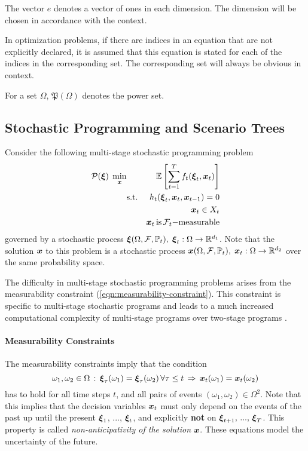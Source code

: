 The vector $e$ denotes a vector of ones in each dimension.
The dimension will be chosen in accordance with the context. 

In optimization problems, if there are indices in an equation that are not explicitly declared, it is assumed that this equation is stated for each of the indices in the corresponding set.
The corresponding set will always be obvious in context.

For a set $\Omega$, $\mathfrak{P}(\Omega)$ denotes the power set.
\subsection{Stochastic Programming and Scenario Trees}
Consider the following multi-stage stochastic programming problem 
\begin{eqnarray}
  \label{eq:genericSP}
  \mathcal{P}(\boldsymbol\xi)\;\min_{\boldsymbol x} &&\mathbb{E}\left[\sum_{t=1}^Tf_t(\boldsymbol\xi_t, \boldsymbol x_t)\right]\\
  &\mathrm{s.t.}& h_t(\boldsymbol\xi_t, \boldsymbol x_t, \boldsymbol x_{t-1}) = 0\\
  &&\boldsymbol x_t \in X_t\\
  &&\boldsymbol x_t \, \mathrm{is}\,\mathcal{F}_t \mathrm{-measurable} \label{eqn:measurability-constraint}
\end{eqnarray}
governed by a stochastic process $\boldsymbol\xi(\Omega, \mathcal{F}, \mathbb{P}_t),\;\boldsymbol\xi_t : \Omega\rightarrow\mathbb{R}^{d_1}$.
Note that the solution $\boldsymbol x$ to this problem is a stochastic process $\boldsymbol x(\Omega, \mathcal{F}, \mathbb{P}_t),\;\boldsymbol x_t : \Omega\rightarrow\mathbb{R}^{d_2}$ over the same probability space.

The difficulty in multi-stage stochastic programming problems arises from the measurability constraint (\ref{eqn:measurability-constraint}).
This constraint is specific to multi-stage stochastic programs and leads to a much increased computational complexity of multi-stage programs over two-stage programs \cite{Shapiro2005,Shapiro2008}.
% 
\paragraph{Measurability Constraints} 
The measurability constraints imply that the condition
\begin{equation}
  \label{eq:mathematical-NAC}
  \omega_1,\omega_2\in \Omega \, : \, \boldsymbol\xi_\tau(\omega_1) = \boldsymbol\xi_\tau(\omega_2)\,\forall \tau\leq t\,\Rightarrow \, \boldsymbol x_t(\omega_1) = \boldsymbol x_t(\omega_2) 
\end{equation}
has to hold for all time steps $t$, and all pairs of events $(\omega_1,\omega_2)\in\Omega^2$. 
Note that this implies that the decision variables $\boldsymbol x_t$ must only depend on the events of the past up until the present $\boldsymbol\xi_1$, ..., $\boldsymbol\xi_t$, and explicitly \textbf{not} on $\boldsymbol\xi_{t+1},\, ...,\,\boldsymbol\xi_T$. 
This property is called \textit{non-anticipativity of the solution} $\boldsymbol x$. 
These equations model the uncertainty of the future.
% 
